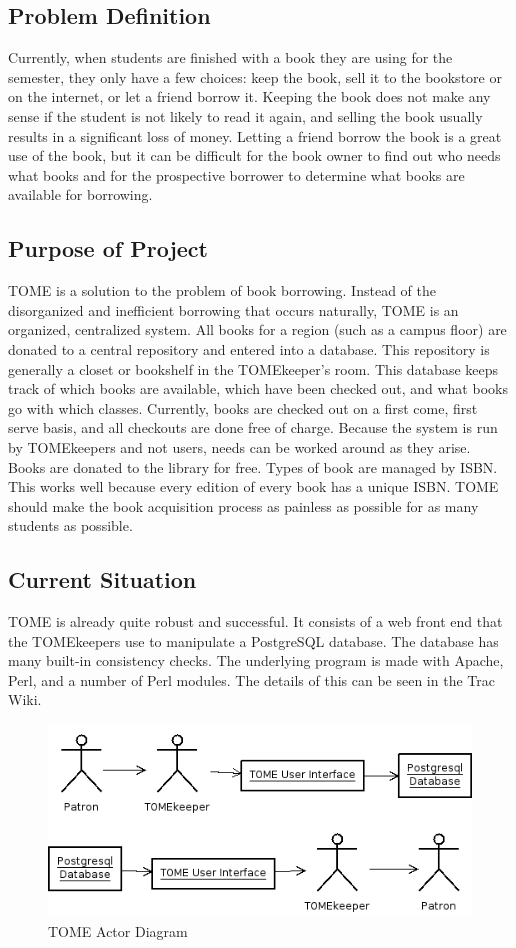 \documentclass[12pt,titlepage]{article}
\begin{document}
\subsection{Problem Definition}
Currently, when students are finished with a book they are using for the semester, they only have a few choices: keep the book, sell it to the bookstore or on the internet, or let a friend borrow it.  Keeping the book does not make any sense if the student is not likely to read it again, and selling the book usually results in a significant loss of money.  Letting a friend borrow the book is a great use of the book, but it can be difficult for the book owner to find out who needs what books and for the prospective borrower to determine what books are available for borrowing.
\subsection{Purpose of Project}
TOME is a solution to the problem of book borrowing.  Instead of the disorganized and inefficient borrowing that occurs naturally, TOME is an organized, centralized system.  All books for a region (such as a campus floor) are donated to a central repository and entered into a database.  This repository is generally a closet or bookshelf in the TOMEkeeper's room.  This database keeps track of which books are available, which have been checked out, and what books go with which classes.  Currently, books are checked out on a first come, first serve basis, and all checkouts are done free of charge.  Because the system is run by TOMEkeepers and not users, needs can be worked around as they arise.  Books are donated to the library for free.  Types of book are managed by ISBN.  This works well because every edition of every book has a unique ISBN.  TOME should make the book acquisition process as painless as possible for as many students as possible.
\subsection{Current Situation}
TOME is already quite robust and successful.  It consists of a web front end that the TOMEkeepers use to manipulate a PostgreSQL database.  The database has many built-in consistency checks.  The underlying program is made with Apache, Perl, and a number of Perl modules.  The details of this can be seen in the Trac Wiki.
\begin{figure}[h]
	\includegraphics[width=\textwidth]{userdiagram}
	\caption{TOME Actor Diagram}
\end{figure}
\end{document}
